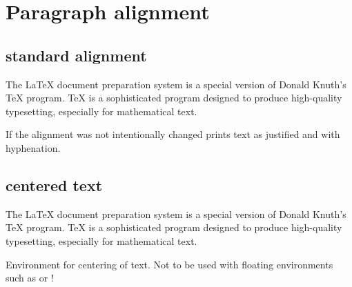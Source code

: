 \begin{filecontents*}{\democodefile}
\newlength{\marginwidth}
\setlength{\marginwidth}{\marginparwidth}
\addtolength{\marginwidth}{\marginparsep}
\end{filecontents*}



%
\section{Paragraph alignment}
\subsection{\latex{} standard alignment}

\begin{filecontents*}{\democodefile}
The \LaTeX{} document preparation 
system is a special version of Donald
Knuth's \TeX{} program. \TeX{} is a 
sophisticated program designed to 
produce high-quality typesetting, 
especially for mathematical text.
\end{filecontents*}

%
If the alignment was not intentionally changed \latex{} prints text as justified and with hyphenation.

\subsection{centered text}
%
\begin{filecontents*}{\democodefile}
\begin{center}
The \LaTeX{} document preparation 
system is a special version of Donald
Knuth's \TeX{} program. \TeX{} is a 
sophisticated program designed to 
produce high-quality typesetting, 
especially for mathematical text.
\end{center}
\end{filecontents*}
%
Environment for centering of text. Not to be used with floating environments such as  or !


